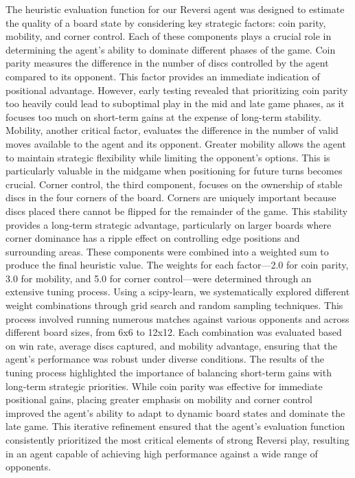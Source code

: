 \documentclass[11pt]{article}
\begin{document}
The heuristic evaluation function for our Reversi agent was designed to estimate the quality of a board state by considering key strategic factors: coin parity, mobility, and corner control. Each of these components plays a crucial role in determining the agent’s ability to dominate different phases of the game. Coin parity measures the difference in the number of discs controlled by the agent compared to its opponent. This factor provides an immediate indication of positional advantage. However, early testing revealed that prioritizing coin parity too heavily could lead to suboptimal play in the mid and late game phases, as it focuses too much on short-term gains at the expense of long-term stability. Mobility, another critical factor, evaluates the difference in the number of valid moves available to the agent and its opponent. Greater mobility allows the agent to maintain strategic flexibility while limiting the opponent's options. This is particularly valuable in the midgame when positioning for future turns becomes crucial. Corner control, the third component, focuses on the ownership of stable discs in the four corners of the board. Corners are uniquely important because discs placed there cannot be flipped for the remainder of the game. This stability provides a long-term strategic advantage, particularly on larger boards where corner dominance has a ripple effect on controlling edge positions and surrounding areas. These components were combined into a weighted sum to produce the final heuristic value. The weights for each factor—2.0 for coin parity, 3.0 for mobility, and 5.0 for corner control—were determined through an extensive tuning process. Using a scipy-learn, we systematically explored different weight combinations through grid search and random sampling techniques. This process involved running numerous matches against various opponents and across different board sizes, from 6x6 to 12x12. Each combination was evaluated based on win rate, average discs captured, and mobility advantage, ensuring that the agent's performance was robust under diverse conditions. The results of the tuning process highlighted the importance of balancing short-term gains with long-term strategic priorities. While coin parity was effective for immediate positional gains, placing greater emphasis on mobility and corner control improved the agent’s ability to adapt to dynamic board states and dominate the late game. This iterative refinement ensured that the agent's evaluation function consistently prioritized the most critical elements of strong Reversi play, resulting in an agent capable of achieving high performance against a wide range of opponents.
\end{document}
